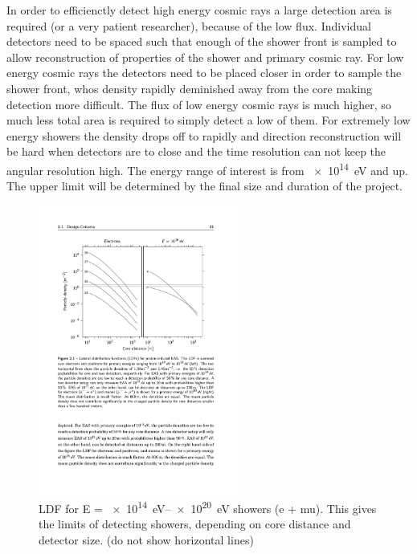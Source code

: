 In order to efficienctly detect high energy cosmic rays a large detection area is required (or a very patient researcher), because of the low flux. Individual detectors need to be spaced such that enough of the shower front is sampled to allow reconstruction of properties of the shower and primary cosmic ray. For low energy cosmic rays the detectors need to be placed closer in order to sample the shower front, whos density rapidly deminished away from the core making detection more difficult. The flux of low energy cosmic rays is much higher, so much less total area is required to simply detect a low of them. For extremely low energy showers the density drops off to rapidly and direction reconstruction will be hard when detectors are to close and the time resolution can not keep the angular resolution high. The energy range of interest is from \SI{e14}{\eV} and up. The upper limit will be determined by the final size and duration of the project.


\begin{figure}
    \centering
    \includegraphics[width=0.6\textwidth]
                    {plots/experiment/ldf_energies}
    \caption{LDF for E = \SIrange{e14}{e20}{\eV} showers (e + mu). This gives the limits of detecting showers, depending on core distance and detector size. (do not show horizontal lines)}
    \label{fig:ldf_energies}
\end{figure}

